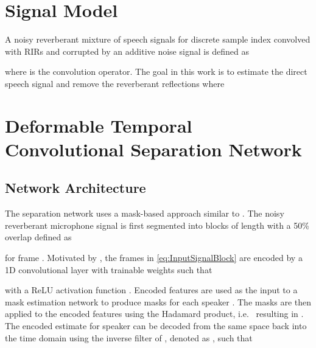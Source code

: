 \documentclass{article}
\begin{document}
\section{Signal Model}\label{sec:sigmod}
A noisy reverberant mixture of  speech signals  for discrete sample index  convolved with \acp{RIR}  and corrupted by an additive noise signal  is defined as

where  is the convolution operator. The goal in this work is to estimate the direct speech signal  and remove the reverberant reflections  where


\section{Deformable Temporal Convolutional Separation Network}\label{sec:dtcn}

\subsection{Network Architecture}
The separation network uses a mask-based approach similar to \cite{convtasnet}. The noisy reverberant microphone signal is first segmented into  blocks of length  with a 50\% overlap defined as

for frame . Motivated by \cite{convtasnet,sepformer}, the frames in \eqref{eq:InputSignalBlock} are encoded by a 1D convolutional layer with trainable weights  such that

with a \ac{ReLU} activation function .
Encoded features  are used as the input to a mask estimation network to produce masks  for each speaker . The masks are then applied to the encoded features using the Hadamard product, i.e.~ resulting in .
The encoded estimate
 for speaker  can be decoded from the same space back into the time domain using the inverse filter of , denoted as , such that
\end{document}
